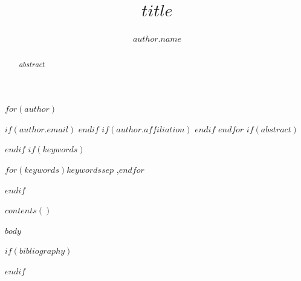 \documentclass[$for(classoption)$$classoption$$sep$,$endfor$]{elsarticle}
\begin{document}
\begin{frontmatter}
\title{$title$}
$for(author)$
\author[$author.n$]{$author.name$}
$if(author.email)$
$endif$
$if(author.affiliation)$
$endif$
$endfor$
$if(abstract)$
\begin{abstract}
$abstract$
\end{abstract}
$endif$
$if(keywords)$
\begin{keyword}
$for(keywords)$$keywords$$sep$ \sep $endfor$
\end{keyword}
$endif$
\end{frontmatter}
$contents()$

$body$

$if(bibliography)$


$endif$
\end{document}
